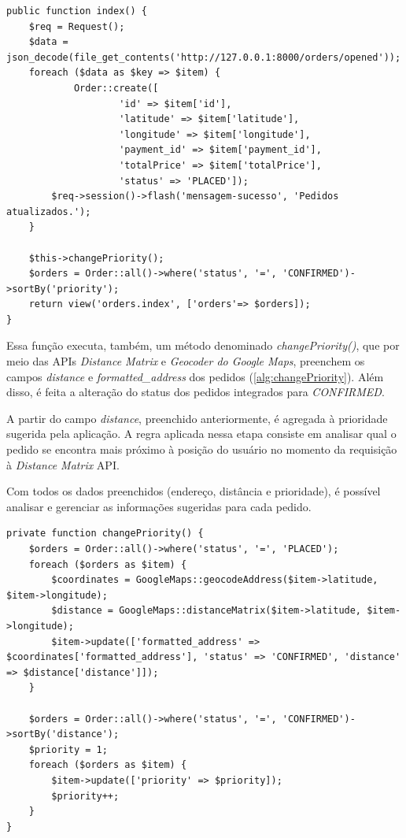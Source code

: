 \begin{lstlisting}[caption={Delivery Routes - Função integradora de pedidos}, style=htmlcssjs, label=alg:orderIndex]
public function index() {
    $req = Request();
    $data = json_decode(file_get_contents('http://127.0.0.1:8000/orders/opened'));
    foreach ($data as $key => $item) {
            Order::create([
                    'id' => $item['id'],
                    'latitude' => $item['latitude'],
                    'longitude' => $item['longitude'],
                    'payment_id' => $item['payment_id'],
                    'totalPrice' => $item['totalPrice'],
                    'status' => 'PLACED']);
        $req->session()->flash('mensagem-sucesso', 'Pedidos atualizados.');
    }

    $this->changePriority();
    $orders = Order::all()->where('status', '=', 'CONFIRMED')->sortBy('priority');
    return view('orders.index', ['orders'=> $orders]);
}
\end{lstlisting}

Essa função executa, também, um método denominado \textit{changePriority()}, que por meio das APIs \textit{Distance Matrix} e \textit{Geocoder do Google Maps}, preenchem os campos \textit{distance} e \textit{formatted\_address} dos pedidos (\autoref{alg:changePriority}). Além disso, é feita a alteração do status dos pedidos integrados para \textit{CONFIRMED}.

A partir do campo \textit{distance}, preenchido anteriormente, é agregada à prioridade sugerida pela aplicação. A regra aplicada nessa etapa consiste em analisar qual o pedido se encontra mais próximo à posição do usuário no momento da requisição à \textit{Distance Matrix} API.

Com todos os dados preenchidos (endereço, distância e prioridade), é possível analisar e gerenciar as informações sugeridas para cada pedido.

\newpage
\begin{lstlisting}[caption={Delivery Routes - Função de troca de prioridade dos pedidos}, style=htmlcssjs, label=alg:changePriority]
 private function changePriority() {
    $orders = Order::all()->where('status', '=', 'PLACED');
    foreach ($orders as $item) {
        $coordinates = GoogleMaps::geocodeAddress($item->latitude, $item->longitude);
        $distance = GoogleMaps::distanceMatrix($item->latitude, $item->longitude);
        $item->update(['formatted_address' => $coordinates['formatted_address'], 'status' => 'CONFIRMED', 'distance' => $distance['distance']]);
    }

    $orders = Order::all()->where('status', '=', 'CONFIRMED')->sortBy('distance');
    $priority = 1;
    foreach ($orders as $item) {
        $item->update(['priority' => $priority]);
        $priority++;
    }
}
\end{lstlisting}